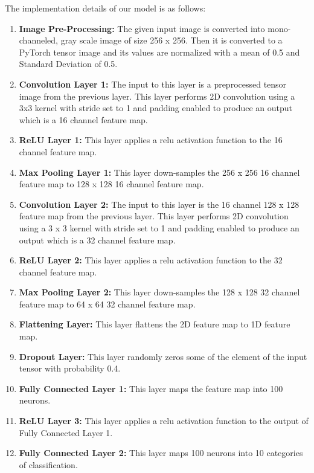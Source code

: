 \documentclass[12pt]{article}
\begin{document}
The implementation details of our model is as follows: 
\begin{enumerate}
	\item \textbf{Image Pre-Processing: } The given input image is converted into mono-channeled, gray scale image of size 256 x 256. Then it is converted to a PyTorch tensor image and its values are normalized with a mean of 0.5 and Standard Deviation of 0.5.   
  
	\item \textbf{Convolution Layer 1:} The input to this layer is a preprocessed tensor image from the previous layer. This layer performs 2D convolution using a 3x3 kernel with stride set to 1 and padding enabled to produce an output which is a 16 channel feature map. 
	
	\item \textbf{ReLU Layer 1:} This layer applies a relu activation function to the 16 channel feature map.
	 
	 \item \textbf{Max Pooling Layer 1:} This layer down-samples the 256 x 256 16 channel feature map to 128 x 128 16 channel feature map.
	 
	 \item \textbf{Convolution Layer 2:} The input to this layer is the 16 channel 128 x 128 feature map from the previous layer. This layer performs 2D convolution using a 3 x 3 kernel with stride set to 1 and padding enabled to produce an output which is a 32 channel feature map. 
	 
	 \item \textbf{ReLU Layer 2:} This layer applies a relu activation function to the 32 channel feature map.
	 
	 \item \textbf{Max Pooling Layer 2:} This layer down-samples the 128 x 128 32 channel feature map to 64 x 64 32 channel feature map.
	 
	 \item \textbf{Flattening Layer: } This layer flattens the 2D feature map to 1D feature map. 
	 
	 \item \textbf{Dropout Layer:} This layer randomly zeros some of the element of the input tensor with probability 0.4. 
	 
	 \item \textbf{Fully Connected Layer 1:} This layer maps the feature map into 100 neurons.
	 
	 \item \textbf{ReLU Layer 3:} This layer applies a relu activation function to the output of Fully Connected Layer 1.
	 
	 \item \textbf{Fully Connected Layer 2:} This layer maps 100 neurons into 10 categories of classification.
	 
\end{enumerate}
\end{document}
